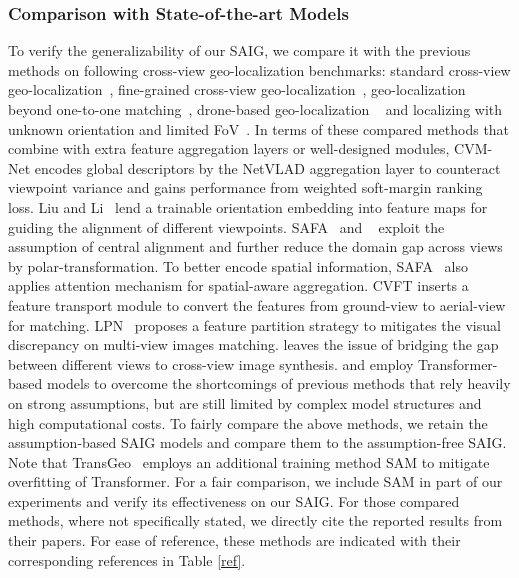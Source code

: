\documentclass[sn-basic,iicol]{sn-jnl}
\theoremstyle{thmstyletwo}\newtheorem{example}{Example}\newtheorem{remark}{Remark}
\theoremstyle{thmstylethree}\newtheorem{definition}{Definition}
\begin{document}
\subsubsection{Comparison with State-of-the-art Models}
 To verify the generalizability of our SAIG, we compare it with the previous methods on following cross-view geo-localization benchmarks: standard cross-view geo-localization~\citep{CVUSA,liu2019lending}, fine-grained cross-view geo-localization~\citep{liu2019lending}, geo-localization beyond one-to-one matching~\citep{VIGOR2021}, drone-based geo-localization ~\citep{2020University-1652} and localizing with unknown orientation and limited FoV~\citep{DSM2020}. In terms of these compared methods that combine with extra feature aggregation layers or well-designed modules, CVM-Net \citep{hu2018cvm} encodes global descriptors by the NetVLAD aggregation layer to counteract viewpoint variance and gains performance from weighted soft-margin ranking loss. Liu and Li~\citep{liu2019lending} lend a trainable orientation embedding into feature maps for guiding the alignment of different viewpoints. SAFA~\citep{SAFA2019} and ~\cite{DSM2020} exploit the assumption of central alignment and further reduce the domain gap across views by polar-transformation. To better encode spatial information, SAFA~\citep{SAFA2019} also applies attention mechanism for spatial-aware aggregation. CVFT \citep{CVFT2020} inserts a feature transport module to convert the features from ground-view to aerial-view for matching. LPN~\citep{wang2021LPN} proposes a feature partition strategy to mitigates the visual discrepancy on multi-view images matching. \cite{coming2021} leaves the issue of bridging the gap between different views to cross-view image synthesis. \cite{L2LTR2021} and \cite{zhu2022transgeo} employ Transformer-based models to overcome the shortcomings of previous methods that rely heavily on strong assumptions, but are still limited by complex model structures and high computational costs. To fairly compare the above methods, we retain the assumption-based SAIG models and compare them to the assumption-free SAIG. Note that TransGeo~\citep{zhu2022transgeo} employs an additional training method SAM \citep{foret2020sharpness} to mitigate overfitting of Transformer. For a fair comparison, we include SAM in part of our experiments and verify its effectiveness on our SAIG. For those compared methods, where not specifically stated, we directly cite the reported results from their papers. For ease of reference, these methods are indicated with their corresponding references in Table \ref{ref}.
\end{document}
